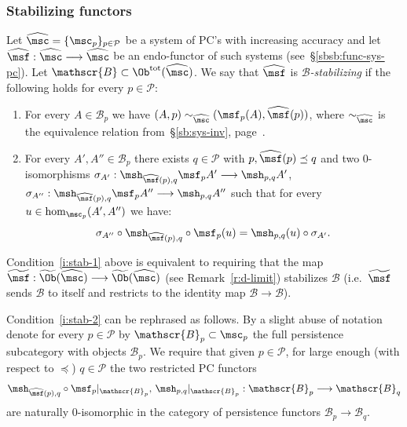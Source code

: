 \subsubsection{Stabilizing functors} \label{sbsb:sfunc} Let
  $\widehat{\msc} = \{ \msc_p\}_{p \in \mathcal{P}}$ be a system of
  PC's with increasing accuracy and let
  $\widehat{\msf}: \widehat{\msc} \longrightarrow \widehat{\msc}$ be
  an endo-functor of such systems (see~\S\ref{sbsb:func-sys-pc}). Let
  $\mathscr{B} \subset \Ob^{\text{tot}}(\widehat{\msc})$. We say that
  $\widehat{\msf}$ is {\em $\mathscr{B}$-stabilizing} if the following
  holds for every $p \in \mathcal{P}$:
  \begin{enumerate}
  \item \label{i:stab-1} For every $A \in \mathscr{B}_p$ we have
    $(A,p) \sim_{\widehat{\msc}} (\msf_p(A), \widehat{\msf}(p))$,
    where $\sim_{\widehat{\msc}}$ is the equivalence relation
    from~\S\ref{sb:sys-inv}, page~\pageref{p:equiv-ob}.
  \item \label{i:stab-2} For every $A', A'' \in \mathscr{B}_p$ there
    exists $q \in \mathcal{P}$ with $p, \widehat{\msf}(p) \preceq q$
    and two $0$-isomorphisms
    $\sigma_{A'}: \msh_{\widehat{\msf}(p), q} \msf_p A'
    \longrightarrow \msh_{p,q}A'$,
    $\sigma_{A''}: \msh_{\widehat{\msf}(p), q} \msf_p A''
    \longrightarrow \msh_{p,q}A''$ such that for every
    $u \in \hom_{\msc_p}(A',A'')$ we have:
    \begin{equation} \label{eq:stab-2} \sigma_{A''} \circ
      \msh_{\widehat{\msf}(p), q} \circ \msf_p(u) = \msh_{p,q}(u)
      \circ \sigma_{A'}.
    \end{equation}
  \end{enumerate}

\begin{rem} \label{r:stab-func} 
Condition~\eqref{i:stab-1}
    above is equivalent to requiring that the map
    $\widetilde{\msf}: \widetilde{\Ob}(\widehat{\msc}) \longrightarrow
    \widetilde{\Ob}(\widehat{\msc})$ (see Remark~\ref{r:d-limit})
    stabilizes $\mathscr{B}$ (i.e.~$\widetilde{\msf}$ sends
    $\mathscr{B}$ to itself and restricts to the identity map
    $\mathscr{B} \longrightarrow \mathscr{B}$).

  Condition~\eqref{i:stab-2} can be rephrased as follows. By a
    slight abuse of notation denote for every $p \in \mathcal{P}$ by
    $\mathscr{B}_p \subset \msc_p$ the full persistence subcategory
    with objects $\mathscr{B}_p$. We require that given
    $p \in \mathcal{P}$, for large enough (with respect to $\preceq$)
    $q \in \mathcal{P}$ the two restricted PC functors
    $$\msh_{\widehat{\msf}(p), q} \circ \msf_p|_{\mathscr{B}_p}, \, 
    \msh_{p,q}|_{\mathscr{B}_p}: \mathscr{B}_p \longrightarrow
    \mathscr{B}_q$$ are naturally $0$-isomorphic in the category of
    persistence functors
    $\mathscr{B}_p \longrightarrow \mathscr{B}_q$.
  \end{rem}

